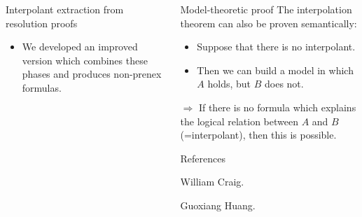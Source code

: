 \documentclass[final,hyperref={pdfpagelabels=true}]{beamer}
\begin{document}
\begin{frame}
\begin{columns}[t]
\begin{column}{\mycolwidth}
\begin{block}{Interpolant extraction from resolution proofs}
\begin{itemize}
					\item We developed an improved version which combines these phases and produces non-prenex formulas.
				\end{itemize}



			\end{block}

		\end{column}
		\begin{column}{\mycolwidth}

			\begin{block}{Model-theoretic proof}
				The interpolation theorem can also be proven semantically:
				\begin{itemize}
					\item Suppose that there is no interpolant.
					\item Then we can build a model in which $A$ holds, but $B$ does not.

				\end{itemize}

				$\Rightarrow$ If there is no formula which explains the logical relation between $A$ and $B$ (=interpolant), then this is possible.
			\end{block}





			\begin{block}{References}
				\begin{thebibliography}{999}

						William Craig.

						Guoxiang Huang.



\end{thebibliography}
\end{block}
\end{column}
\end{columns}
\end{frame}
\end{document}
